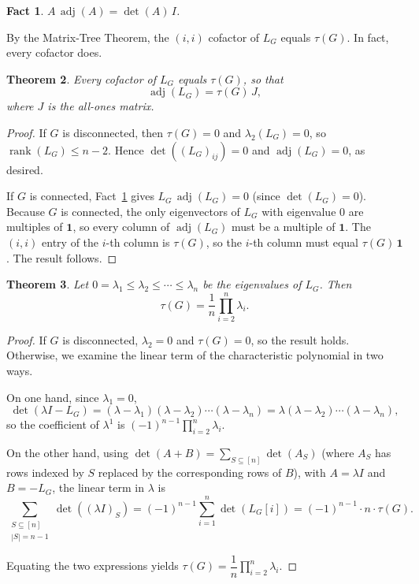 \documentclass[12pt]{article}
\newtheorem{theorem}{Theorem}
\newtheorem{fact}[theorem]{Fact}
\theoremstyle{remark}
\newcommand{\adj}{\operatorname{adj}}
\begin{document}
\begin{fact}
\label{fact:adjugate}
$A\,\adj(A) = \det(A)\,I$.
\end{fact}

By the Matrix-Tree Theorem, the $(i,i)$ cofactor of $L_G$ equals $\tau(G)$. In fact,
every cofactor does.

\begin{theorem}
Every cofactor of $L_G$ equals $\tau(G)$, so that
\[
  \adj(L_G) = \tau(G)\,J,
\]
where $J$ is the all-ones matrix.
\end{theorem}

\begin{proof}
If $G$ is disconnected, then $\tau(G) = 0$ and $\lambda_2(L_G) = 0$, so $\operatorname{rank}(L_G) \leq n-2$.
Hence $\det((L_G)_{ij}) = 0$ and $\adj(L_G) = 0$, as desired.

If $G$ is connected, Fact~\ref{fact:adjugate} gives $L_G\,\adj(L_G) = 0$ (since
$\det(L_G) = 0$). Because $G$ is connected, the only eigenvectors of $L_G$ with
eigenvalue $0$ are multiples of $\mathbf{1}$, so every column of $\adj(L_G)$ must be
a multiple of $\mathbf{1}$. The $(i,i)$ entry of the $i$-th column is $\tau(G)$, so the
$i$-th column must equal $\tau(G)\,\mathbf{1}$. The result follows.
\end{proof}

\begin{theorem}
Let $0 = \lambda_1 \leq \lambda_2 \leq \cdots \leq \lambda_n$ be the eigenvalues of
$L_G$. Then
\[
  \tau(G) = \frac{1}{n}\prod_{i=2}^{n} \lambda_i.
\]
\end{theorem}

\begin{proof}
If $G$ is disconnected, $\lambda_2 = 0$ and $\tau(G) = 0$, so the result holds. Otherwise,
we examine the linear term of the characteristic polynomial in two ways.

On one hand, since $\lambda_1 = 0$,
\[
  \det(\lambda I - L_G) = (\lambda - \lambda_1)(\lambda - \lambda_2)\cdots(\lambda - \lambda_n)
  = \lambda(\lambda - \lambda_2)\cdots(\lambda - \lambda_n),
\]
so the coefficient of $\lambda^1$ is $(-1)^{n-1}\prod_{i=2}^n \lambda_i$.

On the other hand, using $\det(A + B) = \sum_{S \subseteq [n]} \det(A_S)$ (where $A_S$
has rows indexed by $S$ replaced by the corresponding rows of $B$), with $A = \lambda I$
and $B = -L_G$, the linear term in $\lambda$ is
\[
  \sum_{\substack{S \subseteq [n] \\ |S| = n-1}} \det((\lambda I)_S)
  = (-1)^{n-1}\sum_{i=1}^{n} \det(L_G[i])
  = (-1)^{n-1} \cdot n \cdot \tau(G).
\]

Equating the two expressions yields $\tau(G) = \dfrac{1}{n}\displaystyle\prod_{i=2}^{n}\lambda_i$.
\end{proof}
\end{document}
